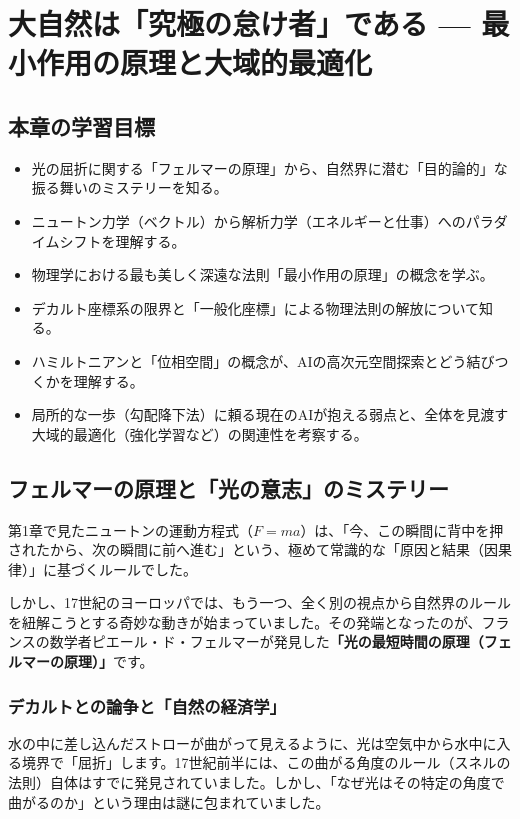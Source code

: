\chapter{大自然は「究極の怠け者」である --- 最小作用の原理と大域的最適化}

\section*{本章の学習目標}
\begin{itemize}
\item 光の屈折に関する「フェルマーの原理」から、自然界に潜む「目的論的」な振る舞いのミステリーを知る。
\item ニュートン力学（ベクトル）から解析力学（エネルギーと仕事）へのパラダイムシフトを理解する。
\item 物理学における最も美しく深遠な法則「最小作用の原理」の概念を学ぶ。
\item デカルト座標系の限界と「一般化座標」による物理法則の解放について知る。
\item ハミルトニアンと「位相空間」の概念が、AIの高次元空間探索とどう結びつくかを理解する。
\item 局所的な一歩（勾配降下法）に頼る現在のAIが抱える弱点と、全体を見渡す大域的最適化（強化学習など）の関連性を考察する。
\end{itemize}

\section{フェルマーの原理と「光の意志」のミステリー}

第1章で見たニュートンの運動方程式（\(F=ma\)）は、「今、この瞬間に背中を押されたから、次の瞬間に前へ進む」という、極めて常識的な「原因と結果（因果律）」に基づくルールでした。

しかし、17世紀のヨーロッパでは、もう一つ、全く別の視点から自然界のルールを紐解こうとする奇妙な動きが始まっていました。その発端となったのが、フランスの数学者ピエール・ド・フェルマーが発見した\textbf{「光の最短時間の原理（フェルマーの原理）」}です。

\subsection{デカルトとの論争と「自然の経済学」}

水の中に差し込んだストローが曲がって見えるように、光は空気中から水中に入る境界で「屈折」します。17世紀前半には、この曲がる角度のルール（スネルの法則）自体はすでに発見されていました。しかし、「なぜ光はその特定の角度で曲がるのか」という理由は謎に包まれていました。

